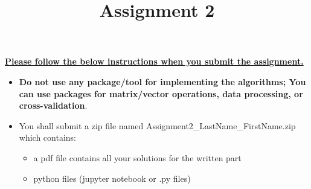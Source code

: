 \documentclass{exam}
\title{Assignment 2}
\date{}
\begin{document}
\maketitle
\thispagestyle{headandfoot}

\begin{center}
  {}
\end{center}
\vspace{.5cm}

\underline{\bf Please follow the below instructions when you submit the assignment.}
\begin{itemize}
\item \textbf{Do not use any package/tool for implementing the algorithms; You can use packages for matrix/vector operations,  data processing,  or cross-validation}.
\item 
You shall submit a zip file named Assignment2\_LastName\_FirstName.zip which contains:
\begin{itemize}
  \item a pdf file contains all your solutions for the written part
  \item python files (jupyter notebook or .py files)
\end{itemize}
\end{itemize}
\vspace{.5cm}
\end{document}
